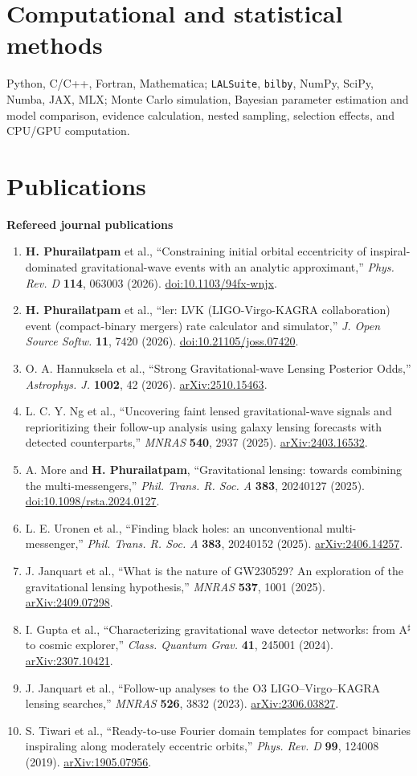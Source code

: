 \documentclass[11pt,a4paper]{article}
\newcommand{\pub}[1]{\item #1}
\begin{document}
\section*{Computational and statistical methods}
Python, C/C++, Fortran, Mathematica; \texttt{LALSuite}, \texttt{bilby}, NumPy, SciPy, Numba, JAX, MLX; Monte Carlo simulation, Bayesian parameter estimation and model comparison, evidence calculation, nested sampling, selection effects, and CPU/GPU computation.

\newpage
\section*{Publications}
\textbf{Refereed journal publications}
\begin{enumerate}[leftmargin=1.5em,topsep=2pt,itemsep=1pt,parsep=0pt]
\pub{\textbf{H. Phurailatpam} et al., ``Constraining initial orbital eccentricity of inspiral-dominated gravitational-wave events with an analytic approximant,'' \emph{Phys. Rev. D} \textbf{114}, 063003 (2026). \href{https://doi.org/10.1103/94fx-wnjx}{doi:10.1103/94fx-wnjx}.}
\pub{\textbf{H. Phurailatpam} et al., ``ler: LVK (LIGO-Virgo-KAGRA collaboration) event (compact-binary mergers) rate calculator and simulator,'' \emph{J. Open Source Softw.} \textbf{11}, 7420 (2026). \href{https://doi.org/10.21105/joss.07420}{doi:10.21105/joss.07420}.}
\pub{O. A. Hannuksela et al., ``Strong Gravitational-wave Lensing Posterior Odds,'' \emph{Astrophys. J.} \textbf{1002}, 42 (2026). \href{https://arxiv.org/abs/2510.15463}{arXiv:2510.15463}.}
\pub{L. C. Y. Ng et al., ``Uncovering faint lensed gravitational-wave signals and reprioritizing their follow-up analysis using galaxy lensing forecasts with detected counterparts,'' \emph{MNRAS} \textbf{540}, 2937 (2025). \href{https://arxiv.org/abs/2403.16532}{arXiv:2403.16532}.}
\pub{A. More and \textbf{H. Phurailatpam}, ``Gravitational lensing: towards combining the multi-messengers,'' \emph{Phil. Trans. R. Soc. A} \textbf{383}, 20240127 (2025). \href{https://doi.org/10.1098/rsta.2024.0127}{doi:10.1098/rsta.2024.0127}.}
\pub{L. E. Uronen et al., ``Finding black holes: an unconventional multi-messenger,'' \emph{Phil. Trans. R. Soc. A} \textbf{383}, 20240152 (2025). \href{https://arxiv.org/abs/2406.14257}{arXiv:2406.14257}.}
\pub{J. Janquart et al., ``What is the nature of GW230529? An exploration of the gravitational lensing hypothesis,'' \emph{MNRAS} \textbf{537}, 1001 (2025). \href{https://arxiv.org/abs/2409.07298}{arXiv:2409.07298}.}
\pub{I. Gupta et al., ``Characterizing gravitational wave detector networks: from A$^\sharp$ to cosmic explorer,'' \emph{Class. Quantum Grav.} \textbf{41}, 245001 (2024). \href{https://arxiv.org/abs/2307.10421}{arXiv:2307.10421}.}
\pub{J. Janquart et al., ``Follow-up analyses to the O3 LIGO--Virgo--KAGRA lensing searches,'' \emph{MNRAS} \textbf{526}, 3832 (2023). \href{https://arxiv.org/abs/2306.03827}{arXiv:2306.03827}.}
\pub{S. Tiwari et al., ``Ready-to-use Fourier domain templates for compact binaries inspiraling along moderately eccentric orbits,'' \emph{Phys. Rev. D} \textbf{99}, 124008 (2019). \href{https://arxiv.org/abs/1905.07956}{arXiv:1905.07956}.}
\end{enumerate}
\end{document}
